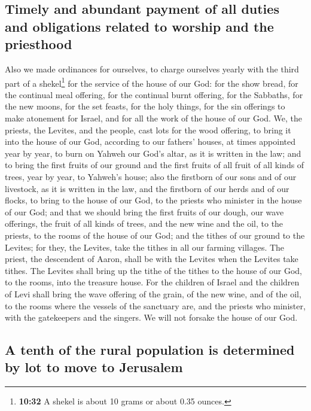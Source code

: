 \hypertarget{timely-and-abundant-payment-of-all-duties-and-obligations-related-to-worship-and-the-priesthood}{%
\subsection{Timely and abundant payment of all duties and obligations
related to worship and the
priesthood}\label{timely-and-abundant-payment-of-all-duties-and-obligations-related-to-worship-and-the-priesthood}}

 Also we made ordinances for ourselves, to charge
ourselves yearly with the third part of a shekel\footnote{\textbf{10:32}
  A shekel is about 10 grams or about 0.35 ounces.} for the service of
the house of our God:  for the show bread, for the
continual meal offering, for the continual burnt offering, for the
Sabbaths, for the new moons, for the set feasts, for the holy things,
for the sin offerings to make atonement for Israel, and for all the work
of the house of our God.  We, the priests, the Levites,
and the people, cast lots for the wood offering, to bring it into the
house of our God, according to our fathers' houses, at times appointed
year by year, to burn on Yahweh our God's altar, as it is written in the
law;  and to bring the first fruits of our ground and the
first fruits of all fruit of all kinds of trees, year by year, to
Yahweh's house;  also the firstborn of our sons and of
our livestock, as it is written in the law, and the firstborn of our
herds and of our flocks, to bring to the house of our God, to the
priests who minister in the house of our God;  and that
we should bring the first fruits of our dough, our wave offerings, the
fruit of all kinds of trees, and the new wine and the oil, to the
priests, to the rooms of the house of our God; and the tithes of our
ground to the Levites; for they, the Levites, take the tithes in all our
farming villages.  The priest, the descendent of Aaron,
shall be with the Levites when the Levites take tithes. The Levites
shall bring up the tithe of the tithes to the house of our God, to the
rooms, into the treasure house.  For the children of
Israel and the children of Levi shall bring the wave offering of the
grain, of the new wine, and of the oil, to the rooms where the vessels
of the sanctuary are, and the priests who minister, with the gatekeepers
and the singers. We will not forsake the house of our God.

\hypertarget{a-tenth-of-the-rural-population-is-determined-by-lot-to-move-to-jerusalem}{%
\subsection{A tenth of the rural population is determined by lot to move
to
Jerusalem}\label{a-tenth-of-the-rural-population-is-determined-by-lot-to-move-to-jerusalem}}


